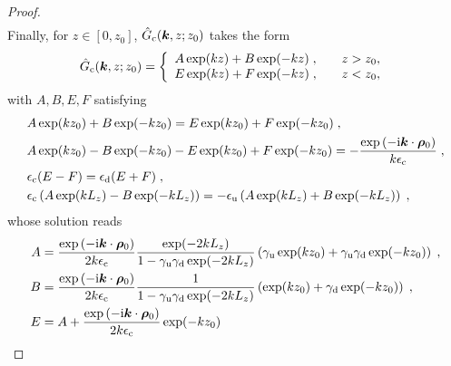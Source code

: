 \begin{proof}
\begin{align*}
\end{align*} 
Finally, for $z\in[0, z_0]$, $\Hat{G}_{\mathrm{c}}(\bm{k}, z; z_0)$ takes the form
\begin{equation*}
    \Hat{G}_{\mathrm{c}}(\bm{k}, z; z_0)=\left \{
            \begin{array}{cc}
                \begin{aligned}
                    & A\exp(kz)+B\exp(-kz)\;,
                \end{aligned} & z>z_0, \\
                \begin{aligned}
                 & E\exp(kz)+F\exp(-kz)\;,
                \end{aligned} & z<z_0,
            \end{array}
        \right. \;
\end{equation*}
with $A, B, E, F$ satisfying
\begin{equation}\label{proof...Matrix}
\begin{aligned}
 &A\exp(kz_0)+B\exp(-kz_0)  = E\exp(kz_0)+F\exp(-kz_0)\;,\\
 &A\exp(kz_0)-B\exp(-kz_0)-E\exp(kz_0)+F\exp(-kz_0)=-\frac{ \exp{(-\mathrm{i} \boldsymbol{k} \cdot \boldsymbol{\rho}_0)}}{k\epsilon_{\mathrm{c}}}\;,\\
 &\epsilon_{\mathrm{c}}(E-F)=\epsilon_{\mathrm{d}}(E+F)\;,\\
 &\epsilon_{\mathrm{c}}\left(A\exp(kL_z)-B\exp(-kL_z)\right)=-\epsilon_{\mathrm{u}}\left(A\exp(kL_z)+B\exp(-kL_z)\right)\;,
\end{aligned}\end{equation}
whose solution reads
\begin{align*}
A&=\frac{ \exp{(-\mathrm{i} \V{k} \cdot \V{\rho}_0)}}{2k\epsilon_{\mrm{c}}}\frac{\exp(-2kL_z)}{1-\gamma_{\mrm{u}}\gamma_{\mrm{d}}\exp(-2kL_z)} \left(\gamma_{\mrm{u}}\exp(kz_0)+\gamma_{\mrm{u}}\gamma_{\mrm{d}}\exp(-kz_0)\right)\;,\\
B&=\frac{ \exp{(-\mathrm{i} \V{k} \cdot \V{\rho}_0)} }{2k\epsilon_{\mrm{c}}}\frac{1}{1-\gamma_{\mrm{u}}\gamma_{\mrm{d}}\exp(-2kL_z)} \left(\exp(kz_0)+\gamma_{\mrm{d}}\exp(-kz_0)\right)\;,\\
E&=A+\frac{\exp{(-\mathrm{i} \V{k} \cdot \V{\rho}_0)} }{2k\epsilon_{\mrm{c}}}\exp(-kz_0)\\

\end{align*}
\end{proof}
